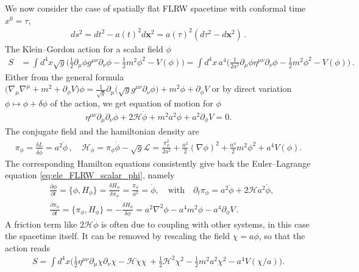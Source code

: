 \documentclass[../QFT_main.tex]{subfiles}
\begin{document}
We now consider the case of spatially flat FLRW spacetime with conformal time $x^0=\tau$,
\begin{align}
    ds^2 = dt^2 - a(t)^2 d\mathbf{x}^2 = a(\tau)^2 (d\tau^2 - d\mathbf{x}^2)\,.
\end{align}
The Klein--Gordon action for a scalar field $\phi$ 
\begin{align}
    S&=\int\!\! d^4x \sqrt{g} \Big(\tfrac12 \partial_\mu\phi g^{\mu\nu}\partial_\nu\phi - \tfrac12 m^2 \phi^2-V(\phi) \Big)=\int\!\! d^4x \, a^4 \Big(\tfrac{1}{2a^2}\partial_\mu\phi \eta^{\mu\nu}\partial_\nu\phi - \tfrac12 m^2 \phi^2-V(\phi) \Big)\,.
\end{align}
Either from the general formula $\big(\nabla_\mu \nabla^\mu + m^2 + \partial_\phi V\big) \phi = \tfrac{1}{\sqrt{g}}\partial_\mu \big(\sqrt{g} g^{\mu\nu} \partial_\nu \phi\big) + m^2 \phi + \partial_\phi V$ or by direct variation $\phi\mapsto \phi + \delta \phi$ of the action, we get equation of motion for $\phi$ 
\begin{align}\label{eq:ele_FLRW_scalar_phi}
     \eta^{\mu\nu}\partial_\mu \partial_\nu \phi + 2 \mathcal{H} \dot{\phi} + m^2 a^2 \phi + a^2 \partial_\phi V = 0.
\end{align}
The conjugate field and the hamiltonian density are
\begin{align}
    \pi_\phi = \frac{\delta L}{\delta \dot{\phi}} = a^2 \dot{\phi}\,, \quad \mathcal{H}_\phi = \pi_\phi \dot{\phi} - \sqrt{g} \mathcal{L} = \frac{\pi_\phi^2}{2a^2} + \frac{a^2}{2} (\nabla \phi)^2 + \frac{a^4}{2} m^2 \phi^2 + a^4 V(\phi).
\end{align}
The corresponding Hamilton equations consistently give back the Euler--Lagrange equation \eqref{eq:ele_FLRW_scalar_phi}, namely
\begin{align}\label{eq:hamilton_eq_FLRW_scalar_phi}
    &\frac{\partial \phi}{\partial t} =\{\phi,H_\phi\} = \frac{\delta H_\phi}{\delta \pi_\phi} = \frac{\pi_\phi}{a^2} = \dot{\phi}, \quad \text{with}\quad \partial_t\pi_\phi = a^2 \ddot{\phi} + 2\mathcal{H} a^2 \dot{\phi}, \\
    &\frac{\partial \pi_\phi}{\partial t} =\{\pi_\phi,H_\phi\} = -\frac{\delta H_\phi}{\delta \phi} = a^2 \nabla^2 \phi - a^4 m^2 \phi - a^4 \partial_\phi V \,.
\end{align}
A friction term like $2\mathcal{H} \dot{\phi}$ is often due to coupling with other systems, in this case the spacetime itself.
It can be removed by rescaling the field $\chi = a \phi$, so that the action reads
\begin{align}
    S = \int d^4x \Big( \tfrac{1}{2}\eta^{\mu\nu} \partial_\mu \chi \partial_\nu \chi -\mathcal{H}\dot{\chi}\chi\,+ \tfrac12\mathcal{H}^2\chi^2- \tfrac{1}{2} m^2 a^2 \chi^2 - a^4 V(\chi/a) \Big).
\end{align}
\end{document}
